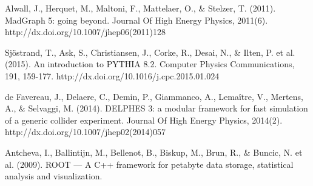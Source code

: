 \documentclass[11pt, oneside]{book}
\begin{document}
\begin{thebibliography}{10}
 Alwall, J., Herquet, M., Maltoni, F., Mattelaer, O., \& Stelzer, T. (2011). MadGraph 5: going beyond. Journal Of High Energy Physics, 2011(6). http://dx.doi.org/10.1007/jhep06(2011)128

Sjöstrand, T., Ask, S., Christiansen, J., Corke, R., Desai, N., \& Ilten, P. et al. (2015). An introduction to PYTHIA 8.2. Computer Physics Communications, 191, 159-177. http://dx.doi.org/10.1016/j.cpc.2015.01.024

 de Favereau, J., Delaere, C., Demin, P., Giammanco, A., Lemaître, V., Mertens, A., \& Selvaggi, M. (2014). DELPHES 3: a modular framework for fast simulation of a generic collider experiment. Journal Of High Energy Physics, 2014(2). http://dx.doi.org/10.1007/jhep02(2014)057

 Antcheva, I., Ballintijn, M., Bellenot, B., Biskup, M., Brun, R., \& Buncic, N. et al. (2009). ROOT — A C++ framework for petabyte data storage, statistical analysis and visualization.

\end{thebibliography}
\end{document}
